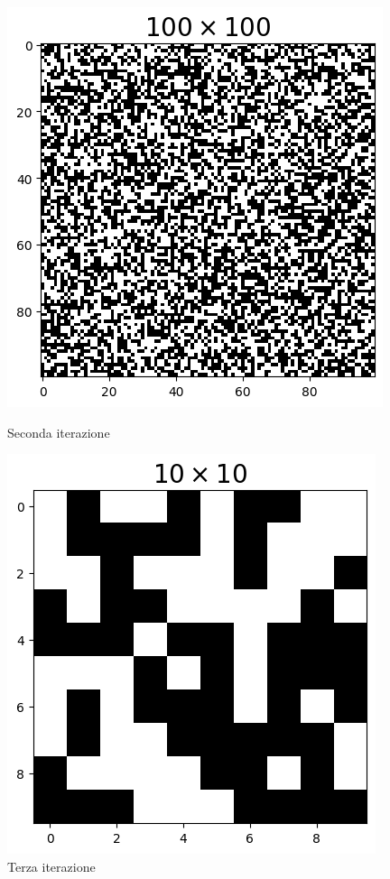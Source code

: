 \begin{figure}[htbp]
    \begin{minipage}{0.45\textwidth}  
      \centering
      \includegraphics[page=1, width=\textwidth]{Immagini/simIsing2D/cg/cg_100_3.0.png}
      \caption{Seconda iterazione}
    \end{minipage}\hfill
    \begin{minipage}{0.45\textwidth}  
      \centering
      \includegraphics[page=1, width=\textwidth]{Immagini/simIsing2D/cg/cg_10_3.0.png}
      \caption{Terza iterazione}
    \end{minipage}


\end{figure}
